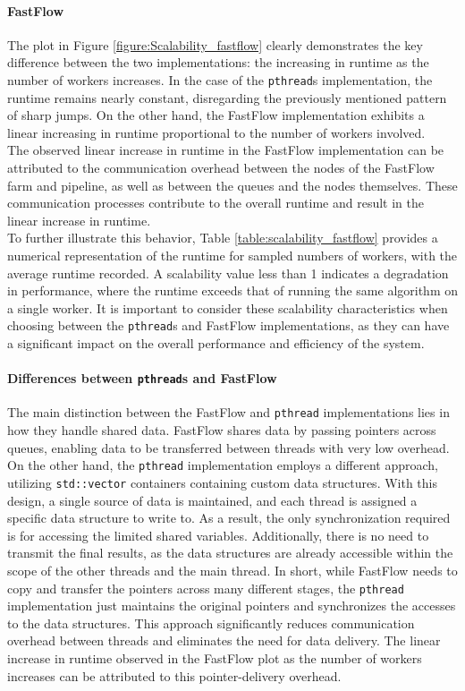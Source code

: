 \documentclass[10pt]{article}
\begin{document}
\paragraph{FastFlow} The plot in Figure \ref{figure:Scalability_fastflow} clearly demonstrates the key difference between the two implementations: the increasing in runtime as the number of workers increases. In the case of the \texttt{pthread}s implementation, the runtime remains nearly constant, disregarding the previously mentioned pattern of sharp jumps. On the other hand, the FastFlow implementation exhibits a linear increasing in runtime proportional to the number of workers involved.\\
The observed linear increase in runtime in the FastFlow implementation can be attributed to the communication overhead between the nodes of the FastFlow farm and pipeline, as well as between the queues and the nodes themselves. These communication processes contribute to the overall runtime and result in the linear increase in runtime.\\
To further illustrate this behavior, Table \ref{table:scalability_fastflow} provides a numerical representation of the runtime for sampled numbers of workers, with the average runtime recorded. A scalability value less than 1 indicates a degradation in performance, where the runtime exceeds that of running the same algorithm on a single worker. It is important to consider these scalability characteristics when choosing between the \texttt{pthread}s and FastFlow implementations, as they can have a significant impact on the overall performance and efficiency of the system.
\paragraph{Differences between \texttt{pthread}s and FastFlow} The main distinction between the FastFlow and \texttt{pthread} implementations lies in how they handle shared data. FastFlow shares data by passing pointers across queues, enabling data to be transferred between threads with very low overhead. On the other hand, the \texttt{pthread} implementation employs a different approach, utilizing \texttt{std::vector} containers containing custom data structures. With this design, a single source of data is maintained, and each thread is assigned a specific data structure to write to. As a result, the only synchronization required is for accessing the limited shared variables. Additionally, there is no need to transmit the final results, as the data structures are already accessible within the scope of the other threads and the main thread. In short, while FastFlow needs to copy and transfer the pointers across many different stages, the \texttt{pthread} implementation just maintains the original pointers and synchronizes the accesses to the data structures. This approach significantly reduces communication overhead between threads and eliminates the need for data delivery. The linear increase in runtime observed in the FastFlow plot as the number of workers increases can be attributed to this pointer-delivery overhead.
\end{document}

